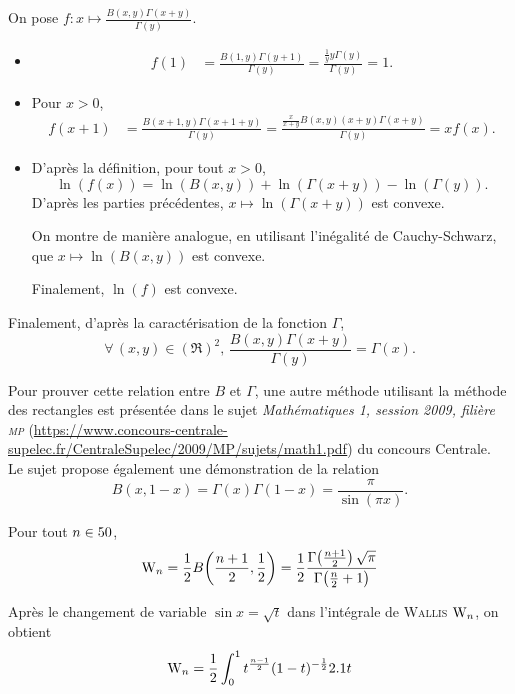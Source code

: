 \begin{demo}
On pose $f : x \mapsto \frac{B(x, y) \Gamma(x + y)}{\Gamma(y)}$.
\begin{itemize}
\item
\begin{align*}
f(1)
&= \frac{B(1, y) \Gamma(y + 1)}{\Gamma(y)}
= \frac{\frac{1}{y} y \Gamma(y)}{\Gamma(y)}
= 1.
\end{align*}

\item Pour $x > 0$,
\begin{align*}
f(x + 1)
&= \frac{B(x + 1, y) \Gamma(x + 1 + y)}{\Gamma(y)}
= \frac{\frac{x}{x + y} B(x, y) (x + y) \Gamma(x + y)}{\Gamma(y)}
= x f(x).
\end{align*}

\item D'après la définition, pour tout $x > 0$,
\[
\ln(f(x)) = \ln(B(x, y)) + \ln(\Gamma(x + y)) - \ln(\Gamma(y)).
\]
D'après les parties précédentes, $x \mapsto \ln(\Gamma(x + y))$ est convexe.

On montre de manière analogue, en utilisant l'inégalité de Cauchy-Schwarz, que $x \mapsto \ln(B(x, y))$ est convexe.

Finalement, $\ln(f)$ est convexe.
\end{itemize}
Finalement, d'après la caractérisation de la fonction $\Gamma$,
\[
\forall\, (x, y) \in (\Re)^2,\,
\frac{B(x, y) \Gamma(x + y)}{\Gamma(y)} = \Gamma(x).
\]
\end{demo}

\begin{remarque}
Pour prouver cette relation entre $B$ et $\Gamma$, une autre méthode utilisant la méthode des rectangles est présentée dans le sujet \textsl{Mathématiques 1, session 2009, filière \textsc{mp}} (\url{https://www.concours-centrale-supelec.fr/CentraleSupelec/2009/MP/sujets/math1.pdf}) du concours Centrale. \\
Le sujet propose également une démonstration de la relation 
\[
B(x, 1 - x) = \Gamma(x) \Gamma(1 - x) = \frac{\pi}{\sin(\pi x)}.
\]
\end{remarque}


\begin{theo}{}
Pour tout $n \in 50$,
\[
\mathrm{W}_n = \frac{1}{2} B\mathopen{}\left(\frac{n+1}{2}, \frac{1}{2} \right) = \frac{1}{2} \frac{\Gamma\mathopen{}\left(\frac{n+1}{2}\right) \sqrt{\pi}}{\Gamma\mathopen{}\left(\frac{n}{2}+1\right)}
\]
\end{theo}

\begin{elemdemo}
Après le changement de variable $\sin x = \sqrt{t}$ dans l'intégrale de \textsc{Wallis} $\mathrm{W}_n$, on obtient
\[
\mathrm{W}_n = \frac{1}{2} \int_0^1 t^{\frac{n-1}{2}} (1-t)^{-\frac{1}{2}} 2.1 t
\]
\end{elemdemo}
